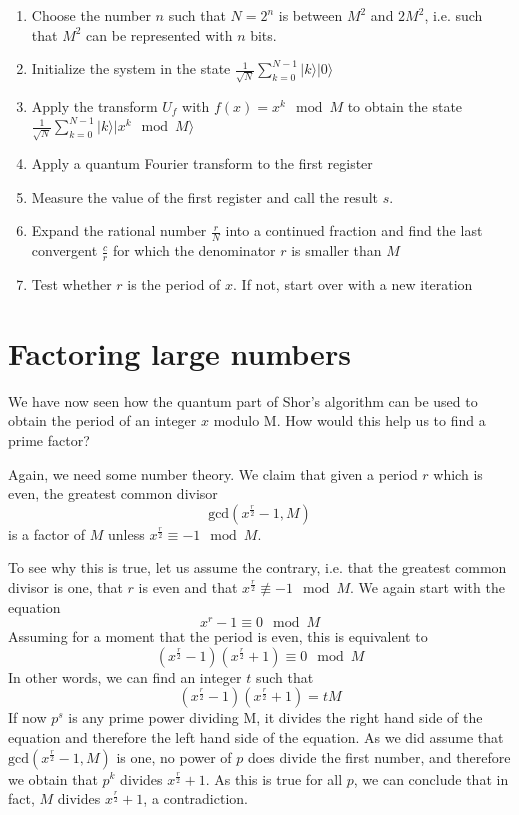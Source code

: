 \documentclass[a4paper, draft]{article}
\theoremstyle{own}
\theoremstyle{remark}
\begin{document}
\begin{enumerate}
	\item Choose the number $n$ such that $N=2^n$ is between $M^2$ and $2M^2$, i.e. such that $M^2$ can be represented with $n$ bits.
	\item Initialize the system in the state $\frac{1}{\sqrt{N}} \sum_{k=0}^{N-1} |k \rangle  |0\rangle$
	\item Apply the transform $U_f$ with $f(x) = x^k \mod M$ to obtain the state
	$\frac{1}{\sqrt{N}} \sum_{k=0}^{N-1} |k \rangle  |x^k \mod M \rangle$
	\item Apply a quantum Fourier transform to the first register
	\item Measure the value of the first register and call the result $s$.
	\item Expand the rational number $\frac{r}{N}$ into a continued fraction and find the last convergent $\frac{c}{r}$ for which the denominator $r$ is smaller than $M$
	\item Test whether $r$ is the period of $x$. If not, start over with a new iteration 
\end{enumerate}




\section{Factoring large numbers}

We have now seen how the quantum part of Shor's algorithm can be used to obtain the period of an integer $x$ modulo M. How would this help us to find a prime factor?

Again, we need some number theory. We claim that given a period $r$ which is even, the greatest common divisor 
$$
\text{gcd}(x^{\frac{r}{2}} - 1, M)
$$
is a factor of $M$ unless $x^{\frac{r}{2}} \equiv - 1 \mod M$. 

To see why this is true, let us assume the contrary, i.e. that the greatest common divisor is one, that $r$ is even and that $x^{\frac{r}{2}} \not\equiv - 1 \mod M$. We again start with the equation
$$
x^r - 1 \equiv 0 \mod M
$$
Assuming for a moment that the period is even, this is equivalent to 
$$
(x^{\frac{r}{2}} - 1) (x^{\frac{r}{2}} + 1) \equiv 0 \mod M
$$
In other words, we can find an integer $t$ such that
$$
(x^{\frac{r}{2}} - 1) (x^{\frac{r}{2}} + 1) = tM
$$
If now $p^s$ is any prime power dividing M, it divides the right hand side of the equation and therefore the left hand side of the equation. As we did assume that  $\text{gcd}(x^{\frac{r}{2}} - 1, M)$ is one, no power of $p$ does divide the first number, and therefore we obtain that $p^k$ divides $x^{\frac{r}{2}} + 1$. As this is true for all $p$, we can conclude that in fact, $M$ divides $x^{\frac{r}{2}} + 1$, a contradiction. 
\end{document}
